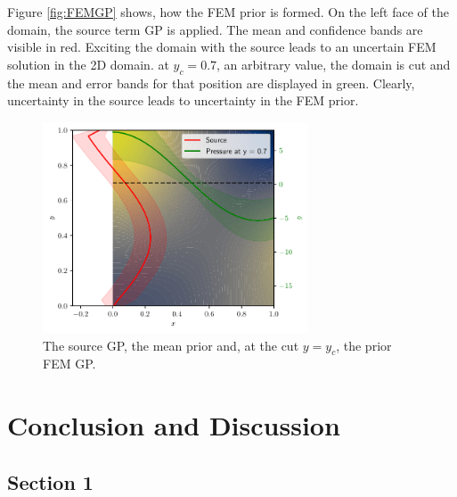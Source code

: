 \documentclass[%
  a4paper,oneside,%
  11pt,%
  smallchapters,
  green,%
  rgb, <cmyk>
  ]{tubsbook}
\begin{document}
Figure \ref{fig:FEMGP} shows, how the FEM prior is formed. On the left face of the domain, the source term GP is applied. The mean and confidence bands are visible in red. Exciting the domain with the source leads to an uncertain FEM solution in the 2D domain. at $y_c = 0.7$, an arbitrary value, the domain is cut and the mean and error bands for that position are displayed in green. Clearly, uncertainty in the source leads to uncertainty in the FEM prior.
\begin{figure}[h]
\includegraphics[width=0.7\textwidth]{pics/SolutionCustom2D.pdf}
\centering
\caption{The source GP, the mean prior and, at the cut $y=y_c$, the prior FEM GP.}
\end{figure}
\label{fig:FEMGP}

\lipsum[2-5] %



\chapter{Conclusion and Discussion}

\lipsum[1-3] %

\section{Section 1}

\lipsum[4-7] %


\printbibliography


%


\end{document}
